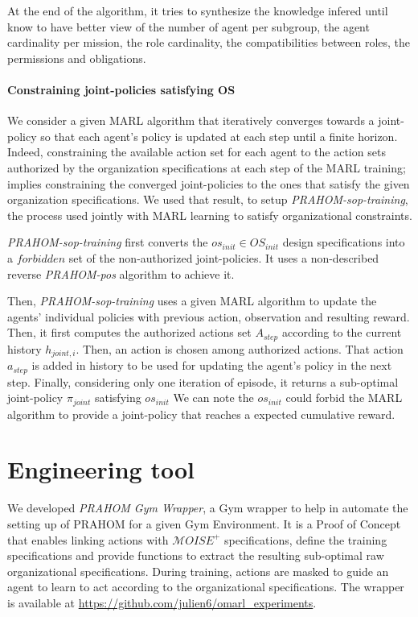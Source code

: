 \documentclass[runningheads]{llncs}
\begin{document}
At the end of the algorithm, it tries to synthesize the knowledge infered until know to have better view of the number of agent per subgroup, the agent cardinality per mission, the role cardinality, the compatibilities between roles, the permissions and obligations.


\paragraph{\textbf{Constraining joint-policies satisfying OS}}

We consider a given MARL algorithm that iteratively converges towards a joint-policy so that each agent's policy is updated at each step until a finite horizon. Indeed, constraining the available action set for each agent to the action sets authorized by the organization specifications at each step of the MARL training; implies constraining the converged joint-policies to the ones that satisfy the given organization specifications. We used that result, to setup \emph{PRAHOM-sop-training}, the process used jointly with MARL learning to satisfy organizational constraints.

\emph{PRAHOM-sop-training} first converts the $os_{init} \in OS_{init}$ design specifications into a $forbidden$ set of the non-authorized joint-policies. It uses a non-described reverse \emph{PRAHOM-pos} algorithm to achieve it.

Then, \emph{PRAHOM-sop-training} uses a given MARL algorithm to update the agents' individual policies with previous action, observation and resulting reward. Then, it first computes the authorized actions set $A_{step}$ according to the current history $h_{joint,i}$. Then, an action is chosen among authorized actions. That action $a_{step}$ is added in history to be used for updating the agent's policy in the next step.
Finally, considering only one iteration of episode, it returns a sub-optimal joint-policy $\pi_{joint}$ satisfying $os_{init}$
We can note the $os_{init}$ could forbid the MARL algorithm to provide a joint-policy that reaches a expected cumulative reward.


\section{Engineering tool}

We developed \emph{PRAHOM Gym Wrapper}\label{gym-wrapper}, a Gym wrapper to help in automate the setting up of PRAHOM for a given Gym Environment. It is a Proof of Concept that enables linking actions with $\mathcal{M}OISE^+$ specifications, define the training specifications and provide functions to extract the resulting sub-optimal raw organizational specifications. During training, actions are masked to guide an agent to learn to act according to the organizational specifications. The wrapper is available at \url{https://github.com/julien6/omarl_experiments}.
\end{document}
